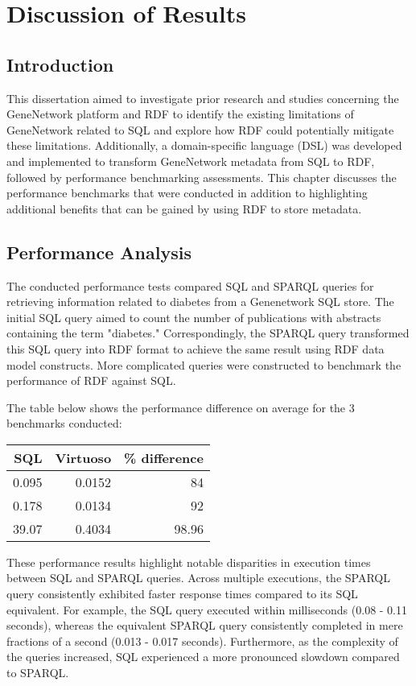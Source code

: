 \chapter{Discussion of Results}

\section{Introduction}

This dissertation aimed to investigate prior research and studies concerning the GeneNetwork platform and RDF to identify the existing limitations of GeneNetwork related to SQL and explore how RDF could potentially mitigate these limitations. Additionally, a domain-specific language (DSL) was developed and implemented to transform GeneNetwork metadata from SQL to RDF, followed by performance benchmarking assessments.  This chapter discusses the performance benchmarks that were conducted in addition to highlighting additional benefits that can be gained by using RDF to store metadata.


\section{Performance Analysis}

The conducted performance tests compared SQL and SPARQL queries for retrieving information related to diabetes from a Genenetwork SQL store. The initial SQL query aimed to count the number of publications with abstracts containing the term "diabetes." Correspondingly, the SPARQL query transformed this SQL query into RDF format to achieve the same result using RDF data model constructs.  More complicated queries were constructed to benchmark the performance of RDF against SQL.

The table below shows the performance difference on average for the 3 benchmarks conducted:

\begin{center}
\begin{tabular}{rrr}
SQL & Virtuoso & \% difference\\[0pt]
\hline
0.095 & 0.0152 & 84\\[0pt]
0.178 & 0.0134 & 92\\[0pt]
39.07 & 0.4034 & 98.96\\[0pt]
\end{tabular}
\end{center}

These performance results highlight notable disparities in execution times between SQL and SPARQL queries. Across multiple executions, the SPARQL query consistently exhibited faster response times compared to its SQL equivalent. For example, the SQL query executed within milliseconds (0.08 - 0.11 seconds), whereas the equivalent SPARQL query consistently completed in mere fractions of a second (0.013 - 0.017 seconds). Furthermore, as the complexity of the queries increased, SQL experienced a more pronounced slowdown compared to SPARQL.


